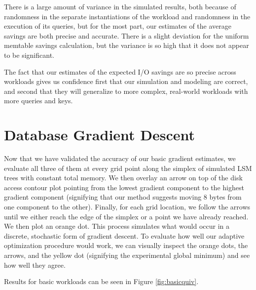 \documentclass{sig-alternate-05-2015}
\begin{document}
There is a large amount of variance in the simulated results, both because of
randomness in the separate instantiations of the workload and randomness in
the execution of its queries, but for the most part, our estimates of the average
savings are both precise and accurate. There is a slight deviation for the uniform
memtable savings calculation, but the variance is so high that it does not appear
to be significant.

The fact that our estimates of the expected I/O savings are so precise across
workloads gives us confidence first that our simulation and modeling are correct,
and second that they will generalize to more complex, real-world workloads
with more queries and keys.

\section{Database Gradient Descent}

Now that we have validated the accuracy of our basic gradient estimates, we
evaluate all three of them at every grid point along the simplex of simulated
LSM trees with constant total memory. We then overlay an arrow on top of the
disk access contour plot pointing from the lowest gradient component to the
highest gradient component (signifying that our method suggests moving 8 bytes
from one component to the other). Finally, for each grid location, we follow
the arrows until we either reach the edge of the simplex or a point we have
already reached.  We then plot an orange dot. This process simulates what would
occur in a discrete, stochastic form of gradient descent. To evaluate how well
our adaptive optimization procedure would work, we can visually inspect the
orange dots, the arrows, and the yellow dot (signifying the experimental global
minimum) and see how well they agree.

Results for basic workloads can be seen in Figure \ref{fig:basicquiv}.
\end{document}
